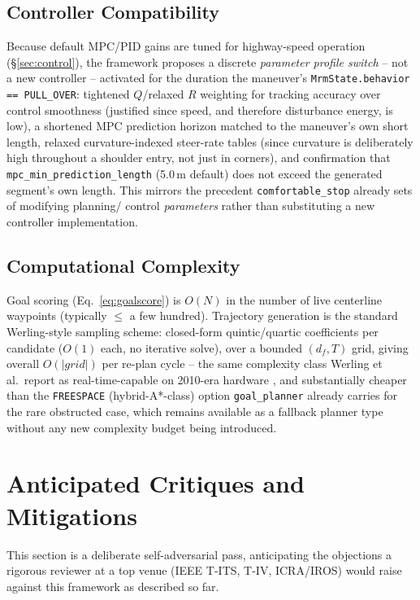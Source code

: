 \documentclass[11pt]{article}
\newcommand{\code}[1]{\texttt{#1}}
\newcommand{\pkg}[1]{\texttt{#1}}
\begin{document}
\subsection{Controller Compatibility}
\label{sec:controllercompat}
Because default MPC/PID gains are tuned for highway-speed operation
(\S\ref{sec:control}), the framework proposes a discrete \emph{parameter profile switch} -- not a
new controller -- activated for the duration the maneuver's \code{MrmState.behavior == PULL\_OVER}:
tightened $Q$/relaxed $R$ weighting for tracking accuracy over control smoothness (justified since
speed, and therefore disturbance energy, is low), a shortened MPC prediction horizon matched to the
maneuver's own short length, relaxed curvature-indexed steer-rate tables (since curvature is
deliberately high throughout a shoulder entry, not just in corners), and confirmation that
\code{mpc\_min\_prediction\_length} (5.0\,m default) does not exceed the generated segment's own
length. This mirrors the precedent \code{comfortable\_stop} already sets of modifying planning/
control \emph{parameters} rather than substituting a new controller implementation.

\subsection{Computational Complexity}
\label{sec:complexity}
Goal scoring (Eq.~\ref{eq:goalscore}) is $O(N)$ in the number of live centerline waypoints
(typically $\leq$ a few hundred). Trajectory generation is the standard Werling-style sampling
scheme: closed-form quintic/quartic coefficients per candidate ($O(1)$ each, no iterative solve),
over a bounded $(d_f, T)$ grid, giving overall $O(|grid|)$ per re-plan cycle -- the same complexity
class Werling et al.\ report as real-time-capable on 2010-era hardware \cite{werling2010frenet},
and substantially cheaper than the \code{FREESPACE} (hybrid-A*-class) option \pkg{goal\_planner}
already carries for the rare obstructed case, which remains available as a fallback planner type
without any new complexity budget being introduced.

\section{Anticipated Critiques and Mitigations}
\label{sec:critique}

This section is a deliberate self-adversarial pass, anticipating the objections a rigorous
reviewer at a top venue (IEEE T-ITS, T-IV, ICRA/IROS) would raise against this framework as
described so far.
\end{document}
